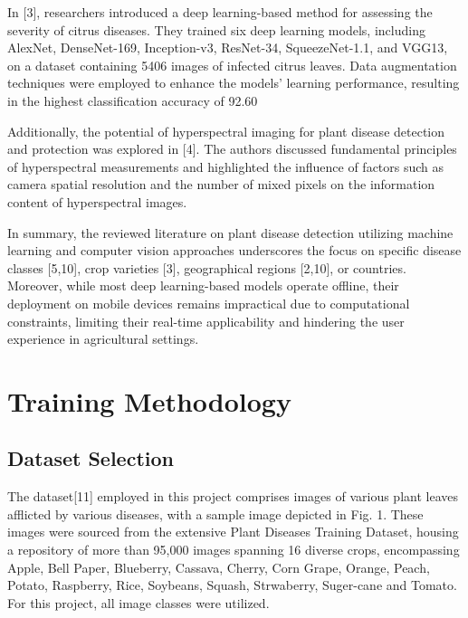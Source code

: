 \documentclass{article}
\begin{document}
In [3], researchers introduced a deep learning-based method for assessing the severity of citrus diseases. They trained six deep learning models, including AlexNet, DenseNet-169, Inception-v3, ResNet-34, SqueezeNet-1.1, and VGG13, on a dataset containing 5406 images of infected citrus leaves. Data augmentation techniques were employed to enhance the models' learning performance, resulting in the highest classification accuracy of 92.60%

Additionally, the potential of hyperspectral imaging for plant disease detection and protection was explored in [4]. The authors discussed fundamental principles of hyperspectral measurements and highlighted the influence of factors such as camera spatial resolution and the number of mixed pixels on the information content of hyperspectral images.

In summary, the reviewed literature on plant disease detection utilizing machine learning and computer vision approaches underscores the focus on specific disease classes [5,10], crop varieties [3], geographical regions [2,10], or countries. Moreover, while most deep learning-based models operate offline, their deployment on mobile devices remains impractical due to computational constraints, limiting their real-time applicability and hindering the user experience in agricultural settings.

\section{Training Methodology}

\subsection{Dataset Selection}

The dataset[11] employed in this project comprises images of various plant leaves afflicted by various diseases, with a sample image depicted in Fig. 1. These images were sourced from the extensive Plant Diseases Training Dataset, housing a repository of more than 95,000 images spanning 16 diverse crops, encompassing Apple, Bell Paper, Blueberry, Cassava, Cherry, Corn Grape, Orange, Peach, Potato, Raspberry, Rice, Soybeans, Squash, Strwaberry, Suger-cane and Tomato. For this project, all image classes were utilized.
\end{document}
